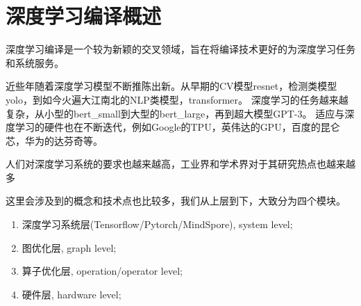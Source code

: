 \chapter{深度学习编译概述}

深度学习编译是一个较为新颖的交叉领域，旨在将编译技术更好的为深度学习任务和系统服务。

近些年随着深度学习模型不断推陈出新。从早期的CV模型resnet，检测类模型yolo，到如今火遍大江南北的NLP类模型，transformer。
深度学习的任务越来越复杂，从小型的{bert\_small}到大型的{bert\_large}，再到超大模型GPT-3。
适应与深度学习的硬件也在不断迭代，例如Google的TPU，英伟达的GPU，百度的昆仑芯，华为的达芬奇等。

人们对深度学习系统的要求也越来越高，工业界和学术界对于其研究热点也越来越多

这里会涉及到的概念和技术点也比较多，我们从上层到下，大致分为四个模块。

\begin{enumerate}
	\item 深度学习系统层(Tensorflow/Pytorch/MindSpore), system level;
    \item 图优化层, graph level;
    \item 算子优化层, operation/operator level;
    \item 硬件层, hardware level;
\end{enumerate}
